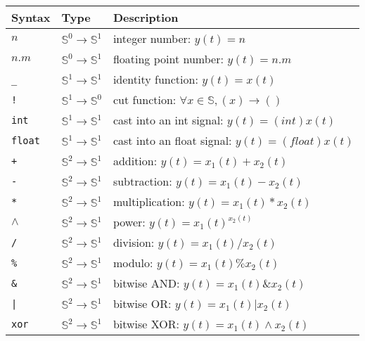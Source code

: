 \begin{tabular}{|l|l|l|}
	\hline
	\textbf{Syntax}      & \textbf{Type}                             & \textbf{Description}                                     \\
	\hline
	$n$                  & $\mathbb{S}^{0}\rightarrow\mathbb{S}^{1}$ & integer number: $y(t)=n$                                 \\
	$n.m$                & $\mathbb{S}^{0}\rightarrow\mathbb{S}^{1}$ & floating point number: $y(t)=n.m$                        \\

	\texttt{\_}          & $\mathbb{S}^{1}\rightarrow\mathbb{S}^{1}$ & identity function: $y(t)=x(t)$                           \\
	\texttt{!}           & $\mathbb{S}^{1}\rightarrow\mathbb{S}^{0}$ & cut function: $\forall x\in\mathbb{S},(x)\rightarrow ()$ \\

	\texttt{int}         & $\mathbb{S}^{1}\rightarrow\mathbb{S}^{1}$ & cast into an int signal: $y(t)=(int)x(t)$                \\
	\texttt{float}       & $\mathbb{S}^{1}\rightarrow\mathbb{S}^{1}$ & cast into an float signal: $y(t)=(float)x(t)$            \\

	\texttt{+}           & $\mathbb{S}^{2}\rightarrow\mathbb{S}^{1}$ & addition: $y(t)=x_{1}(t)+x_{2}(t)$                       \\
	\texttt{-}           & $\mathbb{S}^{2}\rightarrow\mathbb{S}^{1}$ & subtraction: $y(t)=x_{1}(t)-x_{2}(t)$                    \\
	\texttt{*}           & $\mathbb{S}^{2}\rightarrow\mathbb{S}^{1}$ & multiplication: $y(t)=x_{1}(t)*x_{2}(t)$                 \\
	\texttt{$\land$}     & $\mathbb{S}^{2}\rightarrow\mathbb{S}^{1}$ & power: $y(t)=x_{1}(t)^{x_{2}(t)}$                        \\
	\texttt{/}           & $\mathbb{S}^{2}\rightarrow\mathbb{S}^{1}$ & division: $y(t)=x_{1}(t)/x_{2}(t)$                       \\
	\texttt{\%}          & $\mathbb{S}^{2}\rightarrow\mathbb{S}^{1}$ & modulo: $y(t)=x_{1}(t)\%x_{2}(t)$                        \\

	\texttt{\&}          & $\mathbb{S}^{2}\rightarrow\mathbb{S}^{1}$ & bitwise AND: $y(t)=x_{1}(t)\&x_{2}(t)$                   \\
	\texttt{|}           & $\mathbb{S}^{2}\rightarrow\mathbb{S}^{1}$ & bitwise OR: $y(t)=x_{1}(t)|x_{2}(t)$                     \\
	\texttt{xor}         & $\mathbb{S}^{2}\rightarrow\mathbb{S}^{1}$ & bitwise XOR: $y(t)=x_{1}(t)\land x_{2}(t)$               \\


\end{tabular}
